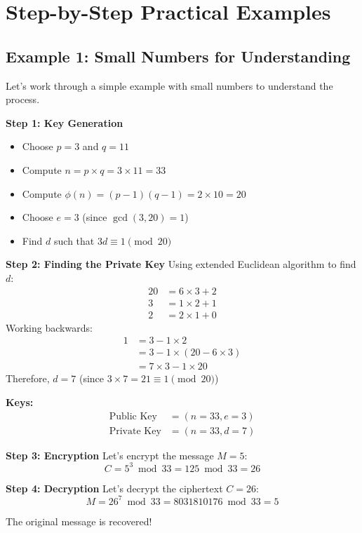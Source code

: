 \documentclass[11pt,a4paper]{article}
\begin{document}
\section{Step-by-Step Practical Examples}

\subsection{Example 1: Small Numbers for Understanding}

Let's work through a simple example with small numbers to understand the process.

\begin{examplebox}
\textbf{Step 1: Key Generation}
\begin{itemize}
    \item Choose $p = 3$ and $q = 11$
    \item Compute $n = p \times q = 3 \times 11 = 33$
    \item Compute $\phi(n) = (p-1)(q-1) = 2 \times 10 = 20$
    \item Choose $e = 3$ (since $\gcd(3, 20) = 1$)
    \item Find $d$ such that $3d \equiv 1 \pmod{20}$
\end{itemize}

\textbf{Step 2: Finding the Private Key}
Using extended Euclidean algorithm to find $d$:
\begin{align*}
20 &= 6 \times 3 + 2 \\
3 &= 1 \times 2 + 1 \\
2 &= 2 \times 1 + 0
\end{align*}
Working backwards:
\begin{align*}
1 &= 3 - 1 \times 2 \\
&= 3 - 1 \times (20 - 6 \times 3) \\
&= 7 \times 3 - 1 \times 20
\end{align*}
Therefore, $d = 7$ (since $3 \times 7 = 21 \equiv 1 \pmod{20}$)

\textbf{Keys:}
\begin{align*}
\text{Public Key} &= (n=33, e=3) \\
\text{Private Key} &= (n=33, d=7)
\end{align*}

\textbf{Step 3: Encryption}
Let's encrypt the message $M = 5$:
$$C = 5^3 \bmod 33 = 125 \bmod 33 = 26$$

\textbf{Step 4: Decryption}
Let's decrypt the ciphertext $C = 26$:
$$M = 26^7 \bmod 33 = 8031810176 \bmod 33 = 5$$

The original message is recovered!
\end{examplebox}
\end{document}
